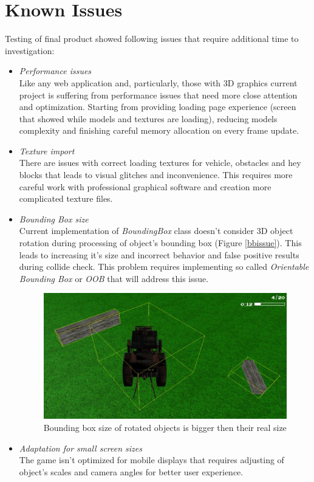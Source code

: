 \documentclass[12pt]{article}
\begin{document}
\section{Known Issues}
Testing of final product showed following issues that require additional time to investigation:
\begin{itemize}
\item \textit{Performance issues}
\\
Like any web application and, particularly, those with 3D graphics current project is suffering from performance issues that need more close attention and optimization. Starting from providing loading page experience (screen that showed while models and textures are loading), reducing models complexity  and finishing careful memory allocation on every frame update.
\item \textit{Texture import}
\\
There are issues with correct loading textures for vehicle, obstacles and hey blocks that leads to visual glitches and inconvenience. This requires more careful work with professional graphical software and creation more complicated texture files.
\item \textit{Bounding Box size} 
\\
Current implementation of \textit{BoundingBox} class doesn't consider 3D object rotation during processing of object's bounding box (Figure \ref{bbissue}). This leads to increasing it's size and incorrect behavior and false positive results during collide check. This problem requires implementing so called \textit{Orientable Bounding Box} or \textit{OOB} that will address this issue.

\begin{figure}[h!]
\begin{center}
\includegraphics[scale=0.4]{../images/bb_issue.jpg}
\end{center}
\caption{Bounding box size of rotated objects is bigger then their real size}
\label{}
\end{figure}

\item \textit{Adaptation for small screen sizes}
\\
The game isn't optimized for mobile displays that requires adjusting of object's scales and camera angles for better user experience.
\end{itemize}

\newpage


\end{document}
